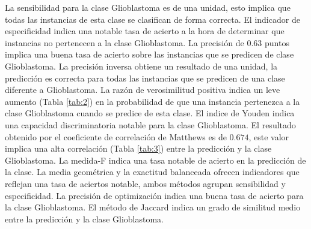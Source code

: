 La sensibilidad para la clase Glioblastoma es de una unidad, esto implica que todas las instancias de esta clase se clasifican de forma correcta. El indicador de especificidad indica una notable tasa de acierto a la hora de determinar que instancias no pertenecen a la clase Glioblastoma. La precisión de $0.63$ puntos implica una buena tasa de acierto sobre las instancias que se predicen de clase Glioblastoma. La precisión inversa obtiene un resultado de una unidad, la predicción es correcta para todas las instancias que se predicen de una clase diferente a Glioblastoma. La razón de verosimilitud positiva indica un leve aumento (Tabla \ref{tab:2}) en la probabilidad de que una instancia pertenezca a la clase Glioblastoma cuando se predice de esta clase. El indice de Youden indica una capacidad discriminatoria notable para la clase Glioblastoma. El resultado obtenido por el coeficiente de correlación de Matthews es de $0.674$, este valor implica una alta correlación (Tabla \ref{tab:3}) entre la predicción y la clase Glioblastoma. La medida-F indica una tasa notable de acierto en la predicción de la clase. La media geométrica y la exactitud balanceada ofrecen indicadores que reflejan una tasa de aciertos notable, ambos métodos agrupan sensibilidad y especificidad. La precisión de optimización indica una buena tasa de acierto para la clase Glioblastoma. El método de Jaccard indica un grado de similitud medio entre la predicción y la clase Glioblastoma.

\bigbreak

